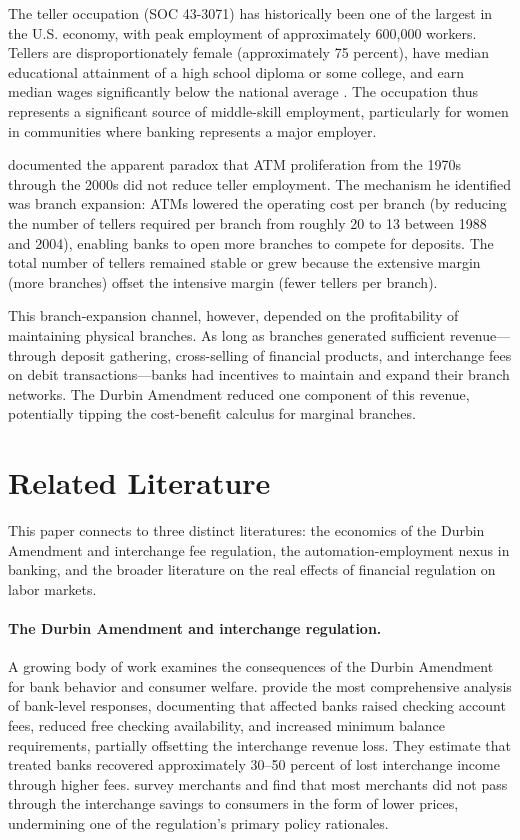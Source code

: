 \documentclass[12pt]{article}
\begin{document}
The teller occupation (SOC 43-3071) has historically been one of the largest in the U.S. economy, with peak employment of approximately 600,000 workers. Tellers are disproportionately female (approximately 75 percent), have median educational attainment of a high school diploma or some college, and earn median wages significantly below the national average \citep{bls2023}. The occupation thus represents a significant source of middle-skill employment, particularly for women in communities where banking represents a major employer.

\citet{bessen2015} documented the apparent paradox that ATM proliferation from the 1970s through the 2000s did not reduce teller employment. The mechanism he identified was branch expansion: ATMs lowered the operating cost per branch (by reducing the number of tellers required per branch from roughly 20 to 13 between 1988 and 2004), enabling banks to open more branches to compete for deposits. The total number of tellers remained stable or grew because the extensive margin (more branches) offset the intensive margin (fewer tellers per branch).

This branch-expansion channel, however, depended on the profitability of maintaining physical branches. As long as branches generated sufficient revenue---through deposit gathering, cross-selling of financial products, and interchange fees on debit transactions---banks had incentives to maintain and expand their branch networks. The Durbin Amendment reduced one component of this revenue, potentially tipping the cost-benefit calculus for marginal branches.


\section{Related Literature}\label{sec:literature}

This paper connects to three distinct literatures: the economics of the Durbin Amendment and interchange fee regulation, the automation-employment nexus in banking, and the broader literature on the real effects of financial regulation on labor markets.

\paragraph{The Durbin Amendment and interchange regulation.} A growing body of work examines the consequences of the Durbin Amendment for bank behavior and consumer welfare. \citet{kay2014} provide the most comprehensive analysis of bank-level responses, documenting that affected banks raised checking account fees, reduced free checking availability, and increased minimum balance requirements, partially offsetting the interchange revenue loss. They estimate that treated banks recovered approximately 30--50 percent of lost interchange income through higher fees. \citet{wang2014} survey merchants and find that most merchants did not pass through the interchange savings to consumers in the form of lower prices, undermining one of the regulation's primary policy rationales.
\end{document}
